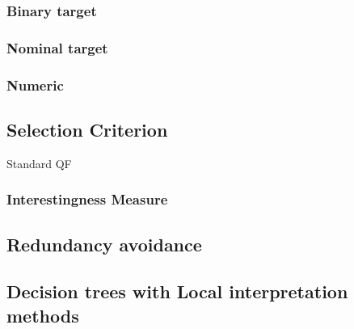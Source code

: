 	\subsubsection{Binary target}
	\subsubsection{Nominal target}
	\subsubsection{Numeric}

\subsection{Selection Criterion}
Standard QF
\subsubsection{Interestingness Measure}
	
\subsection{Redundancy avoidance}

\subsection{Decision trees with Local interpretation methods}